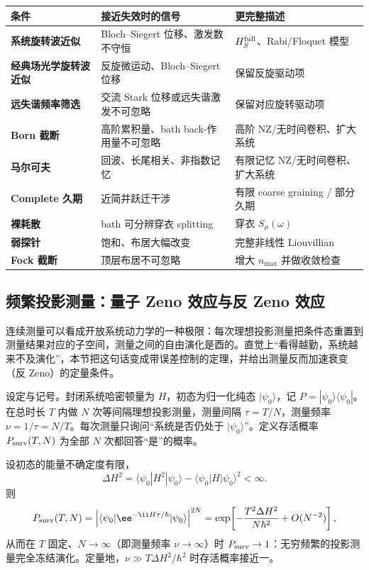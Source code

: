\begin{center}
\small
\begin{tabularx}{0.96\textwidth}{>{\raggedright\arraybackslash\bfseries}p{2.6cm} X X}
\toprule
条件 & 接近失效时的信号 & 更完整描述\\
\midrule
系统旋转波近似 & Bloch--Siegert 位移、激发数不守恒 & $H_S^{\rm full}$、Rabi/Floquet 模型\\
经典场光学旋转波近似 & 反旋微运动、Bloch--Siegert 位移 & 保留反旋驱动项\\
远失谐频率筛选 & 交流 Stark 位移或远失谐激发不可忽略 & 保留对应旋转驱动项\\
Born 截断 & 高阶累积量、bath back-作用量不可忽略 & 高阶 NZ/无时间卷积、扩大系统\\
马尔可夫 & 回波、长尾相关、非指数记忆 & 有限记忆 NZ/无时间卷积、扩大系统\\
Complete 久期 & 近简并跃迁干涉 & 有限 coarse graining / 部分久期\\
裸耗散 & bath 可分辨穿衣 splitting & 穿衣 $S_\mu(\omega)$\\
弱探针 & 饱和、布居大幅改变 & 完整非线性 Liouvillian\\
Fock 截断 & 顶层布居不可忽略 & 增大 $n_{\max}$ 并做收敛检查\\
\bottomrule
\end{tabularx}
\end{center}

\subsection{频繁投影测量：量子 Zeno 效应与反 Zeno 效应}
\label{sec:phys-oqs-zeno}

连续测量可以看成开放系统动力学的一种极限：每次理想投影测量把条件态重置到测量结果对应的子空间，测量之间的自由演化是酉的。直觉上“看得越勤，系统越来不及演化”，本节把这句话变成带误差控制的定理，并给出测量反而加速衰变（反 Zeno）的定量条件。

设定与记号。封闭系统哈密顿量为 \(H\)，初态为归一化纯态 \(|\psi_0\rangle\)，记 \(P=|\psi_0\rangle\langle\psi_0|\)。在总时长 \(T\) 内做 \(N\) 次等间隔理想投影测量，测量间隔 \(\tau=T/N\)，测量频率 \(\nu=1/\tau=N/T\)。每次测量只询问“系统是否仍处于 \(|\psi_0\rangle\)”。定义存活概率 \(P_{\rm surv}(T,N)\) 为全部 \(N\) 次都回答“是”的概率。

\begin{theorem}[量子 Zeno 效应]
设初态的能量不确定度有限，
\[
\Delta H^2=\langle\psi_0|H^2|\psi_0\rangle-\langle\psi_0|H|\psi_0\rangle^2<\infty .
\]
则
\begin{equation}
P_{\rm surv}(T,N)
=\left|\langle\psi_0|\ee^{-\ii H\tau/\hbar}|\psi_0\rangle\right|^{2N}
=\exp\!\left[-\frac{T^2\Delta H^2}{N\hbar^2}+O(N^{-2})\right],
\label{eq:phys-oqs-zeno-survival}
\end{equation}
从而在 \(T\) 固定、\(N\to\infty\)（即测量频率 \(\nu\to\infty\)）时 \(P_{\rm surv}\to1\)：无穷频繁的投影测量完全冻结演化。定量地，\(\nu\gg T\Delta H^2/\hbar^2\) 时存活概率接近一。
\end{theorem}


